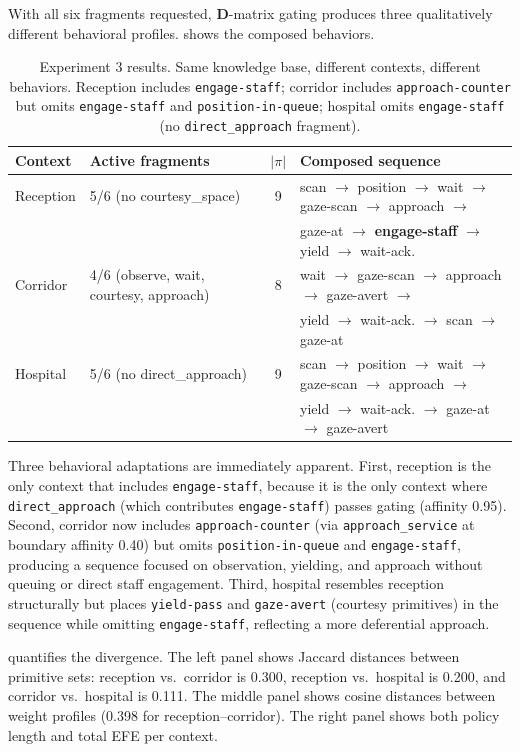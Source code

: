 \documentclass[11pt,a4paper]{article}
\newcommand{\D}{\mathbf{D}}
\begin{document}
With all six fragments requested, $\D$-matrix gating produces three qualitatively different behavioral profiles.   shows the composed behaviors.

\begin{table}[H]
\centering
\small
\begin{tabular}{llcl}
\toprule
Context & Active fragments & $|\pi|$ & Composed sequence \\
\midrule
Reception & 5/6 (no courtesy\_space) & 9 & scan $\to$ position $\to$ wait $\to$ gaze-scan $\to$ approach $\to$ \\
 & & & gaze-at $\to$ \textbf{engage-staff} $\to$ yield $\to$ wait-ack. \\
Corridor & 4/6 (observe, wait, courtesy, approach) & 8 & wait $\to$ gaze-scan $\to$ approach $\to$ gaze-avert $\to$ \\
 & & & yield $\to$ wait-ack. $\to$ scan $\to$ gaze-at \\
Hospital & 5/6 (no direct\_approach) & 9 & scan $\to$ position $\to$ wait $\to$ gaze-scan $\to$ approach $\to$ \\
 & & & yield $\to$ wait-ack. $\to$ gaze-at $\to$ gaze-avert \\
\bottomrule
\end{tabular}
\caption{Experiment 3 results.  Same knowledge base, different contexts, different behaviors.  Reception includes \texttt{engage-staff}; corridor includes \texttt{approach-counter} but omits \texttt{engage-staff} and \texttt{position-in-queue}; hospital omits \texttt{engage-staff} (no \texttt{direct\_approach} fragment).}
\label{tab:exp3}
\end{table}

Three behavioral adaptations are immediately apparent.  First, reception is the only context that includes \texttt{engage-staff}, because it is the only context where \texttt{direct\_approach} (which contributes \texttt{engage-staff}) passes gating (affinity 0.95).  Second, corridor now includes \texttt{approach-counter} (via \texttt{approach\_service} at boundary affinity 0.40) but omits \texttt{position-in-queue} and \texttt{engage-staff}, producing a sequence focused on observation, yielding, and approach without queuing or direct staff engagement.  Third, hospital resembles reception structurally but places \texttt{yield-pass} and \texttt{gaze-avert} (courtesy primitives) in the sequence while omitting \texttt{engage-staff}, reflecting a more deferential approach.

 quantifies the divergence.  The left panel shows Jaccard distances between primitive sets: reception vs.\ corridor is 0.300, reception vs.\ hospital is 0.200, and corridor vs.\ hospital is 0.111.  The middle panel shows cosine distances between weight profiles (0.398 for reception--corridor).  The right panel shows both policy length and total EFE per context.
\end{document}

